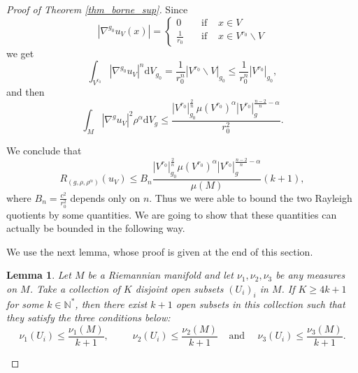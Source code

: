 \documentclass[12pt,reqno]{amsart}		%
\theoremstyle{plain}
\newtheorem{lemma}[thm]{Lemma}
\theoremstyle{definition}
\theoremstyle{remark}
\numberwithin{equation}{section}
\newcommand{\N}{\mathbb{N}}
\renewcommand{\d}{\mathrm{d}}
\begin{document}
\begin{proof}[Proof of Theorem \ref{thm_borne_sup}]
	Since
	\[
	|\nabla^{g_{0}}u_{V}(x)| = \left\{
	\begin{array}{lll}
	0 \quad &\mbox{if }& x\in V\\
	\frac{1}{r_{0}}\quad &\mbox{if }& x\in V^{r_{0}}\backslash V
	\end{array}
	\right.
	\]
	we get
	\[
	\int_{V^{r_{0}}}|\nabla^{g_{0}} u_{V}|^{n}\d V_{g_{0}}
	=\frac{1}{r_{0}^{n}} |V^{r_{0}}\backslash V|_{g_{0}}
	\leqslant \frac{1}{r_{0}^{n}} |V^{r_{0}}|_{g_{0}},
	\]
	and then
	\[\int_{M}|\nabla^{g}u_{V}|^{2}\rho^{\alpha}\d V_{g}\leqslant \frac{|V^{r_{0}}|_{g_{0}}^{\frac{2}{n}}\mu(V^{r_{0}})^{\alpha}\left|V^{r_{0}}\right|_{g}^{\frac{n-2}{n}-\alpha}}{r_{0}^{2}}.\]

	We conclude that
	\begin{equation}
	\label{luc6}
	R_{(g,\rho,\rho^{\alpha})}(u_{V})\leqslant B_{n}\frac{|V^{r_{0}}|_{g_{0}}^{\frac{2}{n}}\mu(V^{r_{0}})^{\alpha}|V^{r_{0}}|_{g}^{\frac{n-2}{n}-\alpha}}{\mu(M)}(k+1),
	\end{equation}
	where $B_{n}=\frac{c^{2}}{r_{0}^{2}}$ depends only on $n$.
	Thus we were able to bound the two Rayleigh quotients by some quantities. We are going to show that these quantities can actually be bounded in the following way.
	
	We use the next lemma, whose proof is given at the end of this section.
	\begin{lemma}
	\label{lemme_3_mesures}
Let $M$ be a Riemannian manifold and let $\nu_1, \nu_2, \nu_3$ be any measures on $M$. Take a collection of $K$ disjoint open subsets $(U_i)_i$ in $M$. If $K \geqslant 4k+1$ for some $k \in \N^*$, then there exist $k+1$ open subsets in this collection such that they satisfy the three conditions below:
\begin{equation*}
\nu_1(U_i) \leqslant \frac{\nu_1(M)}{k+1}, \ \ \ \ \ \ \ \ \ \ \
\nu_2(U_i) \leqslant \frac{\nu_2(M)}{k+1} \ \ \ \ \ \text{and} \ \ \ \ \ \
\nu_3(U_i) \leqslant \frac{\nu_3(M)}{k+1}.
\end{equation*}
	\end{lemma}
	
	
	
	
	
	
	

\end{proof}
\end{document}
